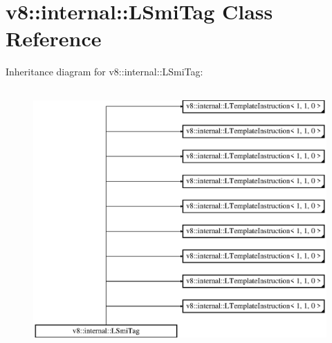 \hypertarget{classv8_1_1internal_1_1_l_smi_tag}{}\section{v8\+:\+:internal\+:\+:L\+Smi\+Tag Class Reference}
\label{classv8_1_1internal_1_1_l_smi_tag}
Inheritance diagram for v8\+:\+:internal\+:\+:L\+Smi\+Tag\+:\begin{figure}[H]
\begin{center}
\leavevmode
\includegraphics[height=10.000000cm]{classv8_1_1internal_1_1_l_smi_tag}
\end{center}
\end{figure}
